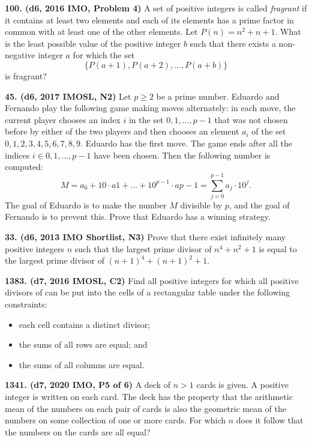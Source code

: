 \documentclass{article}
\begin{document}
\textbf{100. (\color{red}d6\color{black}, 2016 IMO, Problem 4)} A set of positive integers is called \textit{fragrant} if it contains at least two elements and each of its elements has a prime factor in common with at least one of the other elements. Let \(P(n) = n^2 + n + 1.\) What is the least possible value of the positive integer \(b\) such that there exists a non-negative integer \(a\) for which the set
\[\{P\left(a+1\right), P\left(a+2\right), \dots, P\left(a+b\right)\}\]
is fragrant?

\textbf{45. (\color{red}d6\color{black}, 2017 IMOSL, N2)} Let $p \geq 2$ be a prime number. Eduardo and Fernando play the following game making moves alternately: in each move, the current player chooses an index $i$ in the set ${0,1,\dots,p-1}$ that was not chosen before by either of the two players and then chooses an element $a_i$ of the set ${0,1,2,3,4,5,6,7,8,9}$. Eduardo has the first move. The game ends after all the indices $i \in {0,1,\dots,p-1}$ have been chosen. Then the following number is computed: \begin{equation}M = a_0 + 10\cdot a1 + \dots + 10^{p-1} \cdot a{p-1} = \sum_{j=0}^{p-1} a_j \cdot 10^j.\end{equation} The goal of Eduardo is to make the number $M$ divisible by $p$, and the goal of Fernando is to prevent this. Prove that Eduardo has a winning strategy.

\textbf{33. (\color{red}d6\color{black}, 2013 IMO Shortlist, N3)} Prove that there exist infinitely many positive integers $n$ such that the largest prime divisor of $n^4 + n^2 + 1$ is equal to the largest prime divisor of $(n+1)^4 + (n+1)^2 + 1$.

\textbf{1383. (\color{red}d7\color{black}, 2016 IMOSL, C2)} Find all positive integers  for which all positive divisors of  can be put into the cells of a rectangular table under the following constraints:
\begin{itemize}
    \item each cell contains a distinct divisor;
    \item the sums of all rows are equal; and
    \item the sums of all columns are equal.
\end{itemize}

\textbf{1341. (\color{red}d7\color{black}, 2020 IMO, P5 of 6)} A deck of $n > 1$ cards is given. A positive integer is written on each card. The deck has the property that the arithmetic mean of the numbers on each pair of cards is also the geometric mean of the numbers on some collection of one or more cards.
For which $n$ does it follow that the numbers on the cards are all equal?
\end{document}
